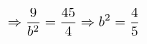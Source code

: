 \documentclass[preview]{standalone}
\begin{document}
\begin{align*}
\special{dvisvgm:raw <g id='unique000'>}\Rightarrow \frac{9}{b^2}=\frac{45}{4} \Rightarrow b^2=\frac{4}{5}\special{dvisvgm:raw </g>}
\end{align*}
\end{document}
